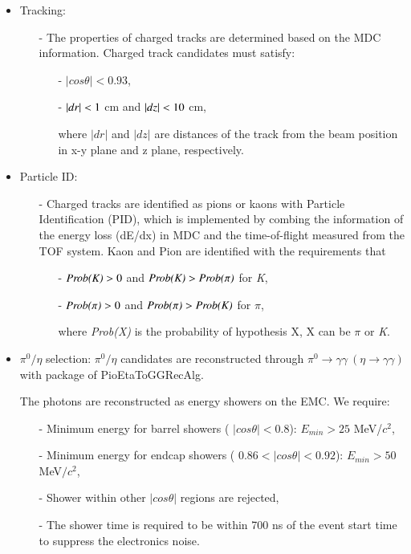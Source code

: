 \begin{itemize}
	\item Tracking:
		\begin{itemize}
			\item[-] The properties of charged tracks are determined based on the MDC information. Charged track candidates must satisfy:
				\begin{itemize}
					\item[-] $|cos\theta| < 0.93$, 
                    \item[-] $|dr| < \boldmath 1 $ cm and $|dz| < \boldmath 10$ cm,

						where $|dr|$ and $|dz|$ are distances of the track from the beam position in x-y plane and z plane, respectively.
				\end{itemize}
		\end{itemize}
	\item Particle ID:
		\begin{itemize}
			\item[-] Charged tracks are identified as pions or kaons with Particle Identification (PID), which is implemented by combing the information of the energy loss (dE/dx) in MDC and the time-of-flight measured from
				the TOF system. Kaon and Pion are identified with the requirements that 
				\begin{itemize}
					\item[-] $\emph{Prob(K)} > 0$ and $\emph{Prob(K)} > \emph{Prob($\pi$)}$ for \emph{K},
					\item[-] $\emph{Prob($\pi$)} > 0$ and $\emph{Prob($\pi$)} > \emph{Prob(K)}$ for \emph{$\pi$},
						
                        where \emph{Prob(X)} is the probability of hypothesis X, X can be \emph{$\pi$} or \emph{K}.
				\end{itemize}
		\end{itemize}
    \item $\pi^{0}/\eta$ selection: $\pi^{0}/\eta$ candidates are reconstructed through $\pi^{0} \rightarrow \gamma\gamma\ (\eta \rightarrow \gamma\gamma)$ with package of PioEtaToGGRecAlg.
		

		The photons are reconstructed as energy showers on the EMC. We require:
		\begin{itemize}
			\item[-] Minimum energy for barrel showers ( $|cos\theta| < 0.8$): $E_{min} >25$ MeV/$c^{2}$,
			\item[-] Minimum energy for endcap showers ( $0.86 < |cos\theta| < 0.92$): $E_{min} >50$ MeV$/c^{2}$,
			\item[-] Shower within other $|cos\theta|$ regions are rejected,
			\item[-] The shower time is required to be within 700 ns of the event start time to suppress the electronics noise. 
		\end{itemize}


\end{itemize}
